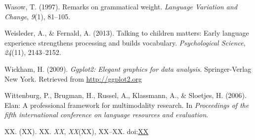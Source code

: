 \documentclass[floatsintext,man]{apa6}
\theoremstyle{definition}
\theoremstyle{definition}
\theoremstyle{definition}
\theoremstyle{remark}
\begin{document}
\hypertarget{ref-wasow1997remarks}{}
Wasow, T. (1997). Remarks on grammatical weight. \emph{Language
Variation and Change}, \emph{9}(1), 81--105.

\hypertarget{ref-weisleder2013talking}{}
Weisleder, A., \& Fernald, A. (2013). Talking to children matters: Early
language experience strengthens processing and builds vocabulary.
\emph{Psychological Science}, \emph{24}(11), 2143--2152.

\hypertarget{ref-R-ggplot2}{}
Wickham, H. (2009). \emph{Ggplot2: Elegant graphics for data analysis}.
Springer-Verlag New York. Retrieved from \url{http://ggplot2.org}

\hypertarget{ref-ELAN}{}
Wittenburg, P., Brugman, H., Russel, A., Klassmann, A., \& Sloetjes, H.
(2006). Elan: A professional framework for multimodality research. In
\emph{Proceedings of the fifth international conference on language
resources and evaluation}.

\hypertarget{ref-lucidIP}{}
XX. (XX). XX. \emph{XX}, \emph{XX}(XX), XX--XX.
doi:\href{https://doi.org/XX}{XX}

\endgroup
\end{document}
